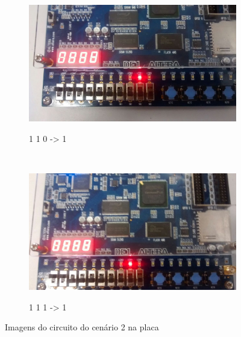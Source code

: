 \begin{figure}
		\begin{subfigure}[b]{0.44\textwidth}
	        \includegraphics[width=\textwidth]{img/cenario2/circ7}
	        \label{fig:circ7}
			\caption{1 1 0 -> 1}
	    \end{subfigure}
	    ~
	    \begin{subfigure}[b]{0.44\textwidth}
	        \includegraphics[width=\textwidth]{img/cenario2/circ8}
	        \label{fig:circ8}
			\caption{1 1 1 -> 1}
	    \end{subfigure}


	    \caption{Imagens do circuito do cenário 2 na placa}\label{fig:fotosCircuito}
	\end{figure}

